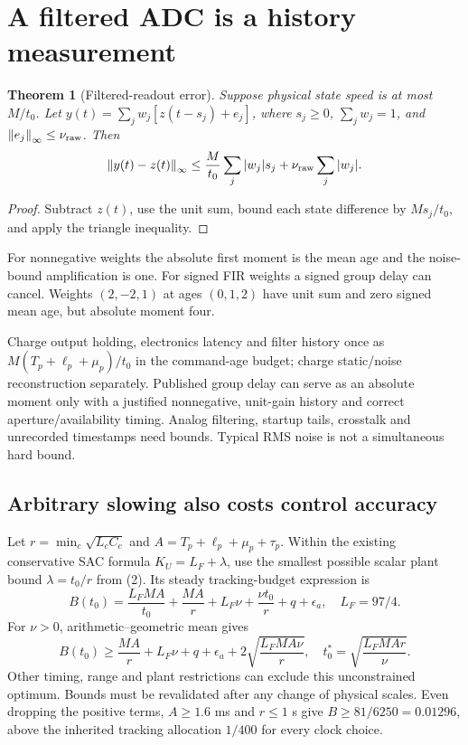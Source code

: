 \documentclass[10pt,a4paper]{article}
\newcommand{\norm}[1]{\left\|#1\right\|_\infty}
\newtheorem{theorem}{Theorem}
\begin{document}
\section{A filtered ADC is a history measurement}
\begin{theorem}[Filtered-readout error]
Suppose physical state speed is at most $M/t_0$. Let
$y(t)=\sum_jw_j[z(t-s_j)+e_j]$, where $s_j\geq0$,
$\sum_jw_j=1$, and $\norm{e_j}\leq\nu_{\rm raw}$. Then
\begin{equation}
\norm{y(t)-z(t)}
\leq\frac{M}{t_0}\sum_j|w_j|s_j+
\nu_{\rm raw}\sum_j|w_j|.
\end{equation}
\end{theorem}
\begin{proof}
Subtract $z(t)$, use the unit sum, bound each state difference by $Ms_j/t_0$, and apply the triangle inequality.
\end{proof}
For nonnegative weights the absolute first moment is the mean age and the noise-bound amplification is one. For signed FIR weights a signed group delay can cancel. Weights $(2,-2,1)$ at ages $(0,1,2)$ have unit sum and zero signed mean age, but absolute moment four.

Charge output holding, electronics latency and filter history once as
$M(T_p+\ell_p+\mu_p)/t_0$ in the command-age budget; charge static/noise reconstruction separately. Published group delay can serve as an absolute moment only with a justified nonnegative, unit-gain history and correct aperture/availability timing. Analog filtering, startup tails, crosstalk and unrecorded timestamps need bounds. Typical RMS noise is not a simultaneous hard bound.
\subsection*{Arbitrary slowing also costs control accuracy}
Let $r=\min_c\sqrt{L_cC_c}$ and $A=T_p+\ell_p+\mu_p+\tau_p$. Within the existing conservative SAC formula $K_U=L_F+\lambda$, use the smallest possible scalar plant bound $\lambda=t_0/r$ from (2). Its steady tracking-budget expression is
\begin{equation}
B(t_0)=\frac{L_FMA}{t_0}+\frac{MA}{r}
+L_F\nu+\frac{\nu t_0}{r}+q+\epsilon_a,\quad L_F=97/4 .
\end{equation}
For $\nu>0$, arithmetic--geometric mean gives
\begin{equation}
B(t_0)\geq\frac{MA}{r}+L_F\nu+q+\epsilon_a+
2\sqrt{\frac{L_FMA\nu}{r}},\quad
t_0^*=\sqrt{\frac{L_FMAr}{\nu}} .
\end{equation}
Other timing, range and plant restrictions can exclude this unconstrained optimum. Bounds must be revalidated after any change of physical scales. Even dropping the positive terms, $A\geq1.6$ ms and $r\leq1$ s give $B\geq81/6250=0.01296$, above the inherited tracking allocation $1/400$ for every clock choice.
\end{document}
